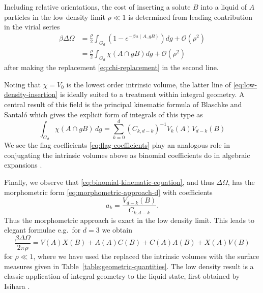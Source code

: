 \documentclass[11pt,twoside]{report}
\begin{document}
Including relative orientations, the cost of inserting a solute $B$ into a liquid of $A$ particles in the low density limit $\rho \ll 1$ is determined from leading contribution in the virial series \cite{Hansen2013,Santos2016}
\begin{equation}\label{eq:low-density-insertion}
  \begin{split}
    \beta\Delta\Omega
    &=
    \frac{\rho}{2} \int_{G_d} \left( 1 - e^{-\beta u(A, gB)} \right) dg
    + \mathcal{O}(\rho^2)
    \\ &=
    \frac{\rho}{2} \int_{G_d} \chi(A \cap gB) dg
    + \mathcal{O}(\rho^2)
  \end{split}
\end{equation}
after making the replacement \eqref{eq:chi-replacement} in the second line.

Noting that $\chi = V_0$ is the lowest order intrinsic volume, the latter line of \eqref{eq:low-density-insertion} is ideally suited to a treatment within integral geometry.
A central result of this field is the principal kinematic formula of Blaschke and Santal\'o \cite{BlaschkeMZ1936,Blaschke1937,SantaloASI1936} which gives the explicit form of integrals of this type as \cite{Santalo2004,Klain1997}
\begin{equation}\label{eq:binomial-kinematic-equation}
  \int_{G_d} \chi(A \cap gB) \, dg
  =
  \sum_{k=0}^d (C_{k,d-k})^{-1} V_k(A) V_{d-k}(B)
\end{equation}
We see the flag coefficients \eqref{eq:flag-coefficients} play an analogous role in conjugating the intrinsic volumes above as binomial coefficients do in algebraic expansions \cite{Klain1997}.

Finally, we observe that \eqref{eq:binomial-kinematic-equation}, and thus $\Delta\Omega$, has the morphometric form \eqref{eq:morphometric-approach-d} with coefficients
\begin{equation*}
  a_k = \frac{V_{d-k}(B)}{C_{k,d-k}}.
\end{equation*}
Thus the morphometric approach is exact in the low density limit.
This leads to elegant formulae e.g.\ for $d = 3$ we obtain
\begin{equation*}\label{eq:low-density-morphometric-result}
  \frac{\beta \Delta \Omega}{2 \pi \rho} =
  V(A) X(B) + A(A) C(B) + C(A) A(B) + X(A) V(B)
\end{equation*}
for $\rho \ll 1$, where we have used the replaced the intrinsic volumes with the surface measures given in Table~\ref{table:geometric-quantities}.
The low density result is a classic application of integral geometry to the liquid state, first obtained by Isihara \cite{IsiharaJCP1950}.
\end{document}
